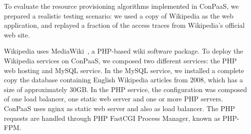 
To evaluate the resource provisioning algorithms implemented in ConPaaS,
we prepared a realistic testing scenario: we used a copy of Wikipedia as
the web application, and replayed a fraction of the access traces from
Wikipedia's official web site.  

Wikipedia uses MediaWiki~\cite{mediawiki}, a PHP-based wiki software 
package.
To deploy the Wikipedia services on ConPaaS, we composed two different services: the PHP web hosting and MySQL service. In the MySQL service, we installed a complete copy the database containing English Wikipedia articles from 2008, which has a size of approximately 30GB.
In the PHP service, the configuration was composed of one load balancer,
one static web server and one or more PHP servers. ConPaaS uses nginx
as static web server and also as load balancer. The PHP requests are 
handled through PHP FastCGI Process Manager, known as PHP-FPM.




